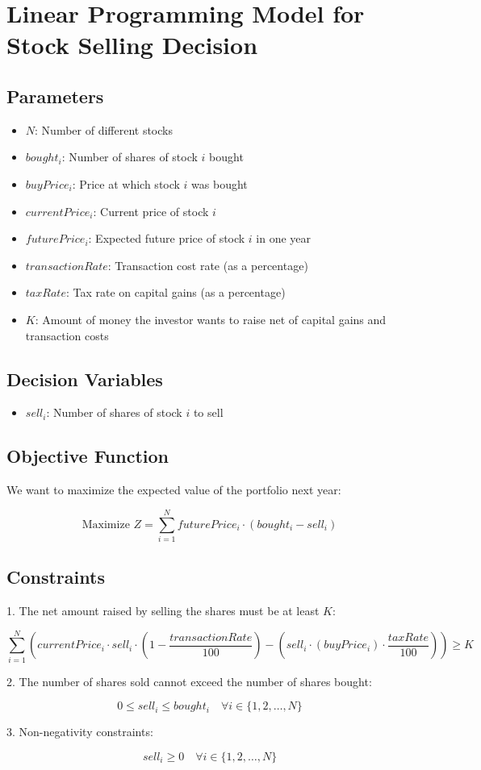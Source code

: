 \documentclass{article}
\begin{document}
\section*{Linear Programming Model for Stock Selling Decision}

\subsection*{Parameters}
\begin{itemize}
    \item $N$: Number of different stocks
    \item $bought_i$: Number of shares of stock $i$ bought
    \item $buyPrice_i$: Price at which stock $i$ was bought
    \item $currentPrice_i$: Current price of stock $i$
    \item $futurePrice_i$: Expected future price of stock $i$ in one year
    \item $transactionRate$: Transaction cost rate (as a percentage)
    \item $taxRate$: Tax rate on capital gains (as a percentage)
    \item $K$: Amount of money the investor wants to raise net of capital gains and transaction costs
\end{itemize}

\subsection*{Decision Variables}
\begin{itemize}
    \item $sell_i$: Number of shares of stock $i$ to sell
\end{itemize}

\subsection*{Objective Function}
We want to maximize the expected value of the portfolio next year:

\[
\text{Maximize } Z = \sum_{i=1}^{N} futurePrice_i \cdot (bought_i - sell_i)
\]

\subsection*{Constraints}
1. The net amount raised by selling the shares must be at least $K$:

\[
\sum_{i=1}^{N} \left( currentPrice_i \cdot sell_i \cdot (1 - \frac{transactionRate}{100}) - \left( sell_i \cdot (buyPrice_i) \cdot \frac{taxRate}{100} \right) \right) \geq K
\]

2. The number of shares sold cannot exceed the number of shares bought:

\[
0 \leq sell_i \leq bought_i \quad \forall i \in \{1, 2, \ldots, N\}
\]

3. Non-negativity constraints:

\[
sell_i \geq 0 \quad \forall i \in \{1, 2, \ldots, N\}
\]
\end{document}
